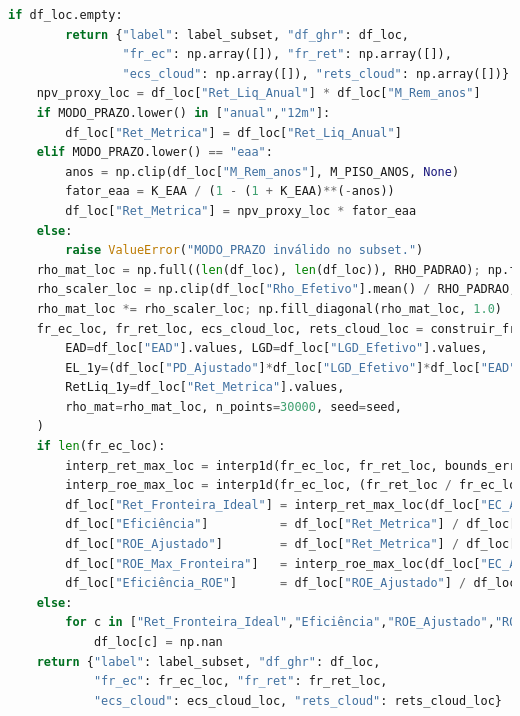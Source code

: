 \documentclass[11pt,a4paper]{article}
\newcommand{\1}{\mathbf{1}}
\begin{document}
\begin{lstlisting}[language=Python, caption={risk_frontier.py (versão completa com normalização por prazo e visões)}]
    if df_loc.empty:
        return {"label": label_subset, "df_ghr": df_loc,
                "fr_ec": np.array([]), "fr_ret": np.array([]),
                "ecs_cloud": np.array([]), "rets_cloud": np.array([])}
    npv_proxy_loc = df_loc["Ret_Liq_Anual"] * df_loc["M_Rem_anos"]
    if MODO_PRAZO.lower() in ["anual","12m"]:
        df_loc["Ret_Metrica"] = df_loc["Ret_Liq_Anual"]
    elif MODO_PRAZO.lower() == "eaa":
        anos = np.clip(df_loc["M_Rem_anos"], M_PISO_ANOS, None)
        fator_eaa = K_EAA / (1 - (1 + K_EAA)**(-anos))
        df_loc["Ret_Metrica"] = npv_proxy_loc * fator_eaa
    else:
        raise ValueError("MODO_PRAZO inválido no subset.")
    rho_mat_loc = np.full((len(df_loc), len(df_loc)), RHO_PADRAO); np.fill_diagonal(rho_mat_loc, 1.0)
    rho_scaler_loc = np.clip(df_loc["Rho_Efetivo"].mean() / RHO_PADRAO, 0.8, 1.5)
    rho_mat_loc *= rho_scaler_loc; np.fill_diagonal(rho_mat_loc, 1.0)
    fr_ec_loc, fr_ret_loc, ecs_cloud_loc, rets_cloud_loc = construir_fronteira(
        EAD=df_loc["EAD"].values, LGD=df_loc["LGD_Efetivo"].values,
        EL_1y=(df_loc["PD_Ajustado"]*df_loc["LGD_Efetivo"]*df_loc["EAD"]).values,
        RetLiq_1y=df_loc["Ret_Metrica"].values,
        rho_mat=rho_mat_loc, n_points=30000, seed=seed,
    )
    if len(fr_ec_loc):
        interp_ret_max_loc = interp1d(fr_ec_loc, fr_ret_loc, bounds_error=False, fill_value="extrapolate")
        interp_roe_max_loc = interp1d(fr_ec_loc, (fr_ret_loc / fr_ec_loc), bounds_error=False, fill_value="extrapolate")
        df_loc["Ret_Fronteira_Ideal"] = interp_ret_max_loc(df_loc["EC_Ajustado"].values)
        df_loc["Eficiência"]          = df_loc["Ret_Metrica"] / df_loc["Ret_Fronteira_Ideal"]
        df_loc["ROE_Ajustado"]        = df_loc["Ret_Metrica"] / df_loc["EC_Ajustado"].replace(0, np.nan)
        df_loc["ROE_Max_Fronteira"]   = interp_roe_max_loc(df_loc["EC_Ajustado"].values)
        df_loc["Eficiência_ROE"]      = df_loc["ROE_Ajustado"] / df_loc["ROE_Max_Fronteira"]
    else:
        for c in ["Ret_Fronteira_Ideal","Eficiência","ROE_Ajustado","ROE_Max_Fronteira","Eficiência_ROE"]:
            df_loc[c] = np.nan
    return {"label": label_subset, "df_ghr": df_loc,
            "fr_ec": fr_ec_loc, "fr_ret": fr_ret_loc,
            "ecs_cloud": ecs_cloud_loc, "rets_cloud": rets_cloud_loc}


\end{lstlisting}
\end{document}
